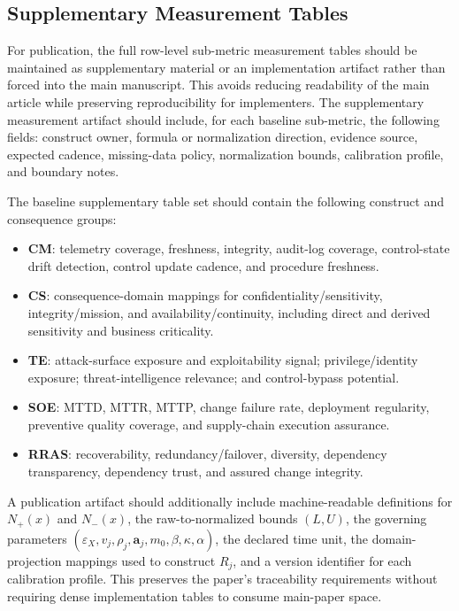 \documentclass[11pt]{article}
\begin{document}
\subsection{Supplementary Measurement Tables}
For publication, the full row-level sub-metric measurement tables should be maintained
as supplementary material or an implementation artifact rather than forced into the
main manuscript. This avoids reducing readability of the main article while preserving
reproducibility for implementers. The supplementary measurement artifact should include,
for each baseline sub-metric, the following fields: construct owner, formula or
normalization direction, evidence source, expected cadence, missing-data policy,
normalization bounds, calibration profile, and boundary notes.

The baseline supplementary table set should contain the following construct and consequence groups:
\begin{itemize}
  \item \textbf{CM}: telemetry coverage, freshness, integrity, audit-log coverage,
  control-state drift detection, control update cadence, and procedure freshness.
  \item \textbf{CS}: consequence-domain mappings for confidentiality/sensitivity,
  integrity/mission, and availability/continuity, including direct and derived
  sensitivity and business criticality.
  \item \textbf{TE}: attack-surface exposure and exploitability signal;
  privilege/identity exposure; threat-intelligence relevance; and control-bypass
  potential.
  \item \textbf{SOE}: MTTD, MTTR, MTTP, change failure rate, deployment regularity,
  preventive quality coverage, and supply-chain execution assurance.
  \item \textbf{RRAS}: recoverability, redundancy/failover, diversity, dependency
  transparency, dependency trust, and assured change integrity.
\end{itemize}

A publication artifact should additionally include machine-readable definitions for
$N_+(x)$ and $N_-(x)$, the raw-to-normalized bounds $(L,U)$, the governing parameters
$(\varepsilon_X,v_j,\rho_j,\mathbf{a}_j,m_0,\beta,\kappa,\alpha)$, the declared time unit,
the domain-projection mappings used to construct $R_j$, and a version identifier for
each calibration profile. This preserves the paper's traceability requirements without
requiring dense implementation tables to consume main-paper space.
\end{document}
